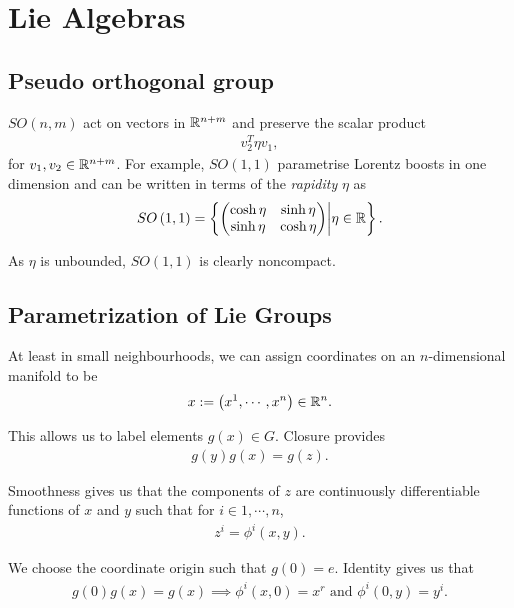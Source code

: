 
\section{Lie Algebras}

\subsection{Pseudo orthogonal group}

$SO\left( n,m \right) $ act on vectors in $\mathbb{R}^{n+m}$ and preserve the scalar product
\begin{align}
    v_2^{T} \eta v_1
,\end{align}
for $v_1, v_2 \in \mathbb{R}^{n+m}$. For example, $SO\left( 1,1 \right) $ parametrise Lorentz boosts in one dimension and can be written in terms of the \textit{rapidity} $\eta$ as
\begin{align}
    SO \left( 1,1 \right) = \left\{  \mqty( \cosh \eta & \sinh \eta \\ \sinh \eta & \cosh \eta) \bigg| \eta \in \R \right\} 
.\end{align}

As $\eta$ is unbounded, $SO \left( 1,1 \right) $ is clearly noncompact.

\subsection{Parametrization of Lie Groups}

At least in small neighbourhoods, we can assign coordinates on an $n$-dimensional manifold to be
\begin{align}
    x := \left( x^{1}, \cdots, x^{n} \right) \in \mathbb{R}^{n}
.\end{align}

This allows us to label elements $g \left( x \right) \in G$. Closure provides
\begin{align}
    g\left( y \right) g\left( x \right) = g\left( z \right) 
.\end{align}

Smoothness gives us that the components of $z$ are continuously differentiable functions of $x$ and $y$ such that for $i \in 1, \cdots, n$,
\begin{align}
    z^{i} = \phi^{i}\left( x,y \right) 
.\end{align}

We choose the coordinate origin such that $g\left( 0 \right) = e$. Identity gives us that
\begin{align}
    g\left( 0 \right) g\left( x \right) = g\left( x \right)  \implies \phi^{i}\left( x,0 \right) = x^{r} \text{~and~}\phi^{i}\left( 0,y \right) = y^{i}
.\end{align}

